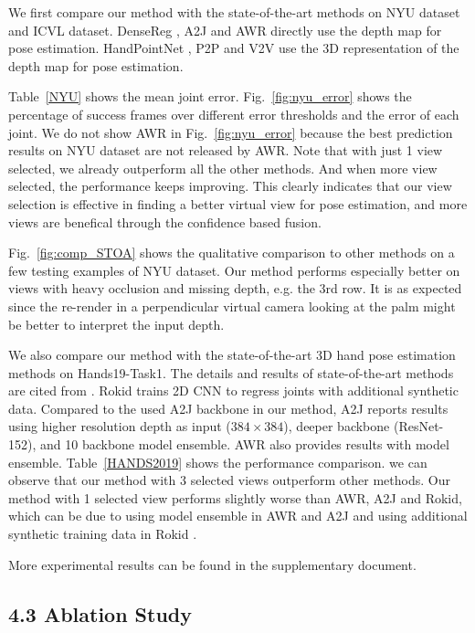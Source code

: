 \documentclass[letterpaper]{article} \usepackage{aaai22}  \usepackage{times}  \usepackage{helvet}  \usepackage{courier}  \usepackage[hyphens]{url}  \usepackage{graphicx} \urlstyle{rm} \def\UrlFont{\rm}  \usepackage{natbib}  \usepackage{caption} \DeclareCaptionStyle{ruled}{labelfont=normalfont,labelsep=colon,strut=off} \frenchspacing  \setlength{\pdfpagewidth}{8.5in}  \setlength{\pdfpageheight}{11in}  \usepackage{algorithm}
\begin{document}
We first compare our method with the state-of-the-art methods
on NYU dataset and ICVL dataset. 
DenseReg \cite{wan2018dense}, A2J \cite{xiong2019a2j} and AWR \cite{huang2020awr} directly use the depth map for pose estimation. HandPointNet \cite{ge2018_Point}, P2P \cite{ge2018point} and V2V \cite{moon2018v2v}\cite{hruz2021hand} use the 3D representation of the depth map for pose estimation.

Table~\ref{NYU} shows the mean joint error. Fig.~\ref{fig:nyu_error} shows the percentage of success frames over different error thresholds and the error of each joint. We do not show AWR in Fig.~\ref{fig:nyu_error} because the best prediction results on NYU dataset are not released by AWR.
Note that with just 1 view selected, we already outperform all the other methods. And when more view selected, the performance keeps improving.
This clearly indicates that our view selection is effective in finding a better virtual view for pose estimation, and more views are benefical through the confidence based fusion.

Fig.~\ref{fig:comp_STOA} shows the qualitative comparison to other methods on a few testing examples of NYU dataset.
Our method performs especially better on views with heavy occlusion and missing depth, e.g. the 3rd row.
It is as expected since the re-render in a perpendicular virtual camera looking at the palm might be better to interpret the input depth.

We also compare our method with the state-of-the-art 3D hand pose estimation methods 
on Hands19-Task1. The details and results of state-of-the-art methods are cited from \cite{armagan2020measuring}. {Rokid} \cite{zhang2020handaugment} trains 2D CNN to regress joints with additional synthetic data.
Compared to the used A2J backbone in our method, 
{A2J} \cite{xiong2019a2j} reports results using higher resolution depth as input ($384 \times 384$), deeper backbone (ResNet-152), and 10 backbone model ensemble. {AWR} \cite{huang2020awr} also provides results with model ensemble.
Table~\ref{HANDS2019} shows the performance comparison. we can observe that our method with 3 selected views outperform other methods.
Our method with 1 selected view performs slightly worse than {AWR}, {A2J} and {Rokid}, which can be due to
using model ensemble in {AWR} and {A2J} and using additional synthetic training data in {Rokid} \cite{zhang2020handaugment}.  

More experimental results can be found in the supplementary document.

\subsection{4.3 Ablation Study}
\end{document}
